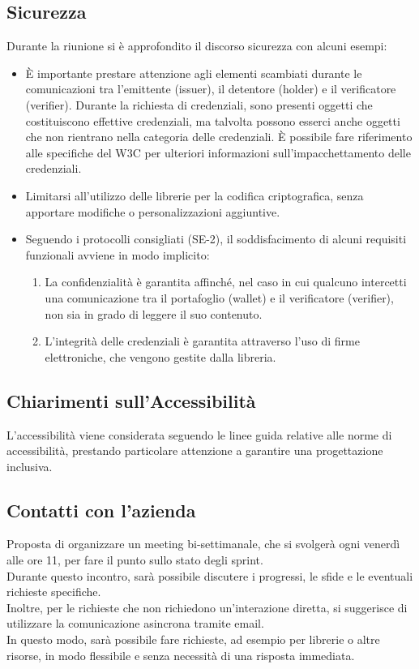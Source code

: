 \subsection{Sicurezza}
Durante la riunione si è approfondito il discorso sicurezza con alcuni esempi:
\begin{itemize}
    \item È importante prestare attenzione agli elementi scambiati durante le comunicazioni tra l'emittente (issuer), il detentore (holder) e il verificatore (verifier).
     Durante la richiesta di credenziali, sono presenti oggetti che costituiscono effettive credenziali, ma talvolta possono esserci anche oggetti che non rientrano nella categoria delle credenziali. È possibile fare riferimento alle specifiche del W3C per ulteriori informazioni sull'impacchettamento delle credenziali.
    \item Limitarsi all'utilizzo delle librerie per la codifica criptografica, senza apportare modifiche o personalizzazioni aggiuntive.
    \item Seguendo i protocolli consigliati (SE-2), il soddisfacimento di alcuni requisiti funzionali avviene in modo implicito:
      \begin{enumerate}
        \item La confidenzialità è garantita affinché, nel caso in cui qualcuno intercetti una comunicazione tra il portafoglio (wallet) e il verificatore (verifier), non sia in grado di leggere il suo contenuto.
        \item L'integrità delle credenziali è garantita attraverso l'uso di firme elettroniche, che vengono gestite dalla libreria.
      \end{enumerate}
   
\end{itemize}


\subsection{Chiarimenti sull'Accessibilità}
L'accessibilità viene considerata seguendo le linee guida relative alle norme di accessibilità, prestando particolare attenzione a garantire una progettazione inclusiva.

\subsection{Contatti con l'azienda}

Proposta di organizzare un meeting bi-settimanale, che si svolgerà ogni venerdì alle ore 11, per fare il punto sullo stato degli sprint.\\
Durante questo incontro, sarà possibile discutere i progressi, le sfide e le eventuali richieste specifiche.\\
Inoltre, per le richieste che non richiedono un'interazione diretta, si suggerisce di utilizzare la comunicazione asincrona tramite email.\\
In questo modo, sarà possibile fare richieste, ad esempio per librerie o altre risorse, in modo flessibile e senza necessità di una risposta immediata.

